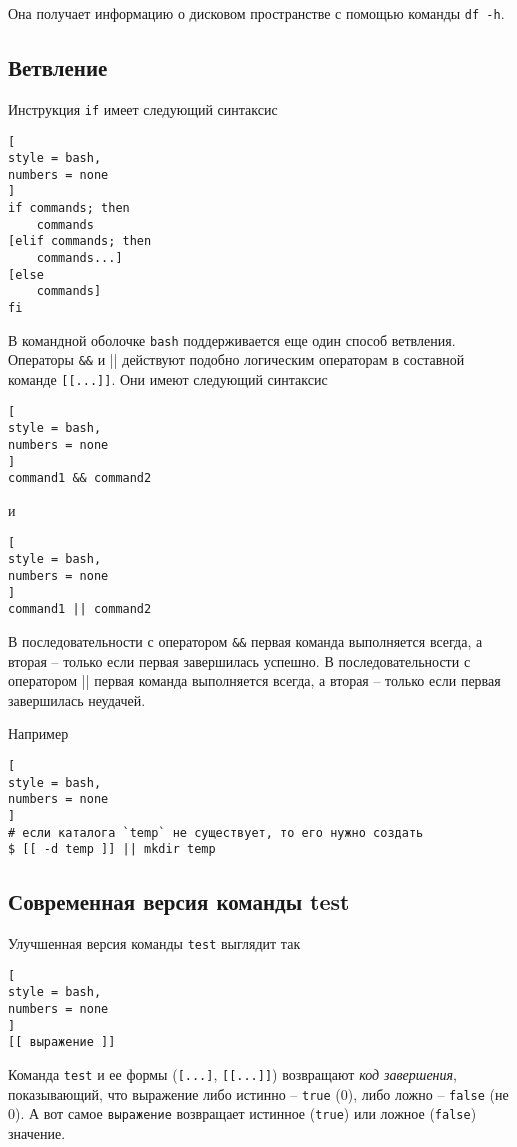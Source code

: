 \documentclass[%
	11pt,
	a4paper,
	utf8,
		]{article}
\begin{document}
Она получает информацию о дисковом пространстве с помощью команды \verb|df -h|.

\subsection{Ветвление}

Инструкция \texttt{if} имеет следующий синтаксис
\begin{lstlisting}[
style = bash,
numbers = none
]
if commands; then
    commands
[elif commands; then
    commands...]
[else
    commands]
fi
\end{lstlisting}

В командной оболочке \texttt{bash} поддерживается еще один способ ветвления. Операторы \verb|&&| и \verb|||| действуют подобно логическим операторам в составной команде \verb|[[...]]|. Они имеют следующий синтаксис
\begin{lstlisting}[
style = bash,
numbers = none
]
command1 && command2
\end{lstlisting}
и
\begin{lstlisting}[
style = bash,
numbers = none
]
command1 || command2
\end{lstlisting}

В последовательности с оператором \verb|&&| первая команда выполняется всегда, а вторая -- только если первая завершилась успешно. В последовательности с оператором \verb|||| первая команда выполняется всегда, а вторая -- только если первая завершилась неудачей.

Например
\begin{lstlisting}[
style = bash,
numbers = none
]
# если каталога `temp` не существует, то его нужно создать
$ [[ -d temp ]] || mkdir temp
\end{lstlisting}


\subsection{Современная версия команды test}

Улучшенная версия команды \texttt{test} выглядит так
\begin{lstlisting}[
style = bash,
numbers = none
]
[[ выражение ]]
\end{lstlisting}

Команда \texttt{test} и ее формы (\verb|[...]|, \verb|[[...]]|) возвращают \emph{код завершения}, показывающий, что выражение либо истинно -- \texttt{true} (0), либо ложно -- \texttt{false} (не 0). А вот самое \texttt{выражение} возвращает истинное (\texttt{true}) или ложное (\texttt{false}) значение.
\end{document}

